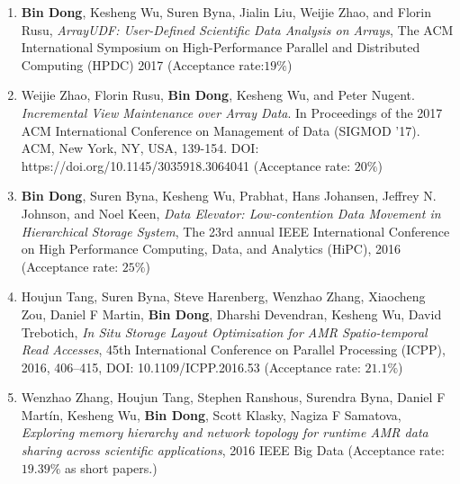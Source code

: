 \documentclass[letterpaper,11pt]{article}
\begin{document}
\begin{enumerate}[1)]
\item \textbf{Bin Dong}, Kesheng Wu, Suren Byna, Jialin Liu, Weijie Zhao, and Florin Rusu, \textit{ArrayUDF: User-Defined Scientific Data Analysis on Arrays}, The ACM International Symposium on High-Performance Parallel and Distributed Computing (HPDC) 2017 (Acceptance rate:$19\%$)

\item Weijie Zhao, Florin Rusu, \textbf{Bin Dong}, Kesheng Wu, and Peter Nugent. \textit{Incremental View Maintenance over Array Data}. In Proceedings of the 2017 ACM International Conference on Management of Data (SIGMOD '17). ACM, New York, NY, USA, 139-154. DOI: https://doi.org/10.1145/3035918.3064041 (Acceptance rate: $20\%$)
\item \textbf{Bin Dong}, Suren Byna, Kesheng Wu, Prabhat, Hans Johansen, Jeffrey N. Johnson, and Noel Keen, \textit{Data Elevator: Low-contention Data Movement in Hierarchical Storage System}, The 23rd annual IEEE International Conference on High Performance Computing, Data, and Analytics (HiPC), 2016 (Acceptance rate: $25\%$)
\item Houjun Tang, Suren Byna, Steve Harenberg, Wenzhao Zhang, Xiaocheng Zou, Daniel F Martin, \textbf{Bin Dong}, Dharshi Devendran, Kesheng Wu, David Trebotich, \textit{In Situ Storage Layout Optimization for AMR Spatio-temporal Read Accesses}, 45th International Conference on Parallel Processing (ICPP), 2016, 406--415, DOI: 10.1109/ICPP.2016.53 (Acceptance rate: $21.1\%$)

\item Wenzhao Zhang, Houjun Tang, Stephen Ranshous, Surendra Byna, Daniel F Martín, Kesheng Wu, \textbf{Bin Dong}, Scott Klasky, Nagiza F Samatova, \textit{Exploring memory hierarchy and network topology for runtime AMR data sharing across scientific applications}, 2016 IEEE Big Data (Acceptance rate: $19.39\%$ as short papers.)


\end{enumerate}
\end{document}
